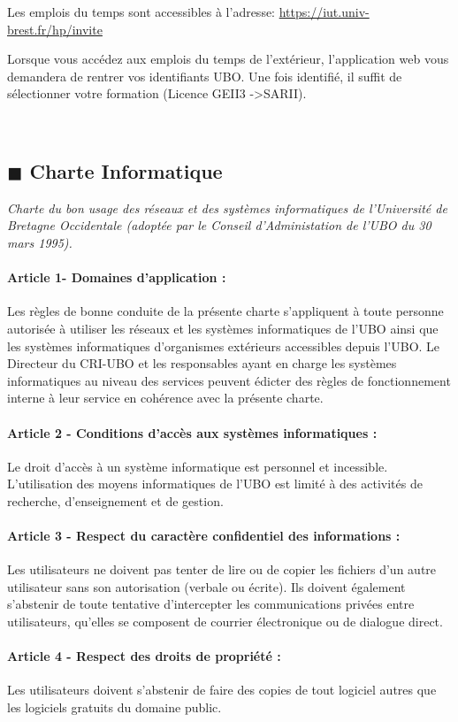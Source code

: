\documentclass[11pt]{article}
\newcommand{\mysubsection}[1]
{~\\
{\noindent
\begin{minipage}{\linewidth}
\subsection*{$\blacksquare$ #1}
\end{minipage}
}
}
\begin{document}
{{\begin{multicols*}{2}
Les emplois du temps sont accessibles à l'adresse: \url{https://iut.univ-brest.fr/hp/invite}

Lorsque vous accédez aux emplois du temps de l'extérieur, l'application web vous demandera de rentrer vos identifiants UBO. Une fois identifié, il suffit de sélectionner votre formation (Licence GEII3 ->SARII).

\end{multicols*}




\mysubsection{Charte Informatique}
\vspace{-0.5cm}
\begin{multicols*}{2}
\raggedcolumns
\textit{Charte du bon usage des réseaux et des systèmes informatiques de l'Université de Bretagne Occidentale (adoptée par le Conseil d'Administation de l'UBO du 30 mars 1995).}

\paragraph{Article 1- Domaines d'application :}
Les règles de bonne conduite de la présente charte s'appliquent à toute personne autorisée à utiliser les réseaux et les systèmes informatiques de l'UBO ainsi que les systèmes informatiques d'organismes extérieurs accessibles depuis l'UBO. Le Directeur du CRI-UBO et les responsables ayant en charge les systèmes informatiques au niveau des services peuvent édicter des règles de fonctionnement interne à leur service en cohérence avec la présente charte.
\paragraph{Article 2 - Conditions d'accès aux systèmes informatiques :}
Le droit d'accès à un système informatique est personnel et incessible. L'utilisation des moyens informatiques de l'UBO est limité à des activités de recherche, d'enseignement et de gestion.
\paragraph{Article 3 - Respect du caractère confidentiel des informations :}
Les utilisateurs ne doivent pas tenter de lire ou de copier les fichiers d'un autre utilisateur sans son autorisation (verbale ou écrite). Ils doivent également s'abstenir de toute tentative d'intercepter les communications privées entre utilisateurs, qu'elles se composent de courrier électronique ou de dialogue direct.
\paragraph{Article 4 - Respect des droits de propriété :}
Les utilisateurs doivent s'abstenir de faire des copies de tout logiciel autres que les logiciels gratuits du domaine public.

\end{multicols*}}}
\end{document}
